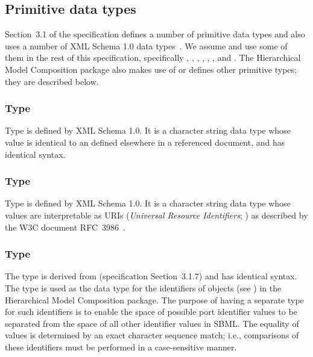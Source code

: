 \subsection{Primitive data types}
\label{new-primitive-types}

Section~3.1 of the \sbmlthreecore specification defines a number of primitive data types and also uses a number of XML Schema 1.0 data types~\citep{biron:2000}.  We assume and use some of them in the rest of this specification, specifically , , , , , , and .  The Hierarchical Model Composition package also makes use of or defines other primitive types; they are described below.


\subsubsection{Type \fixttspace{}}
\label{primtype-idref}

Type  is defined by XML Schema 1.0.  It is a character string data type whose value is identical to an  defined  elsewhere in a referenced document, and has identical syntax.


\subsubsection{Type \fixttspace{}}
\label{primtype-anyuri}
\label{primtype-uri}

Type  is defined by XML Schema 1.0.  It is a character string data type whose values are interpretable as URIs (\emph{Universal   Resource Identifiers}; \citealt{harold:2001,w3c:2000}) as described by the W3C document RFC~3986~\citep{rfc3986}.


\subsubsection{Type \fixttspace{}}
\label{primtype-portid}

The type  is derived from  (\sbmlthreecore specification Section~3.1.7) and has identical syntax. The  type is used as the data type for the identifiers of \Port objects (see ) in the Hierarchical Model Composition package.  The purpose of having a separate type for such identifiers is to enable the space of possible port identifier values to be separated from the space of all other identifier values in SBML.  The equality of  values is determined by an exact character sequence match; i.e., comparisons of these identifiers must be performed in a case-sensitive manner.


